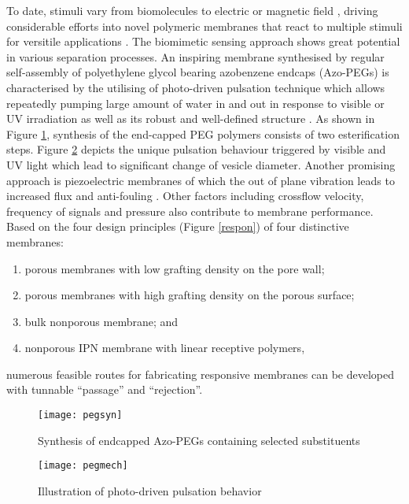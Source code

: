 \documentclass[a4paper,12pt]{report}
\begin{document}
To date, stimuli vary from biomolecules \citep{561bio} to electric \citep{562ele} or magnetic field \citep{563mag}, driving considerable efforts into novel polymeric membranes that react to multiple stimuli for versitile applications \citep{57shi}. The biomimetic sensing approach shows great potential in various separation processes. An inspiring membrane synthesised by regular self-assembly of polyethylene glycol bearing azobenzene endcaps (Azo-PEGs) is characterised by the utilising of photo-driven pulsation technique which allows repeatedly pumping large amount of water in and out in response to visible or UV irradiation as well as its robust and well-defined structure \citep{58hu}. As shown in Figure \ref{pegsyn}, synthesis of the end-capped PEG polymers consists of two esterification steps. Figure \ref{pegmech} depicts the unique pulsation behaviour triggered by visible and UV light which lead to significant change of vesicle diameter. Another promising approach is piezoelectric membranes of which the out of plane vibration leads to increased flux and anti-fouling \citep{59dare}. Other factors including crossflow velocity, frequency of signals and pressure also contribute to membrane performance. Based on the four design principles (Figure \ref{respon}) \citep{15fane} of four distinctive membranes: \begin{enumerate}
\item porous membranes with low grafting density on the pore wall; 
\item porous membranes with high grafting density on the porous surface; 
\item bulk nonporous membrane; and 
\item nonporous IPN membrane with linear receptive polymers, 
\end{enumerate}
numerous feasible routes for fabricating responsive membranes can be developed with tunnable \enquote{passage} and \enquote{rejection}.

\begin{figure}[h!]
\centering
  \texttt{[image: pegsyn]}
  \caption{Synthesis of endcapped Azo-PEGs containing selected substituents}
  \label{pegsyn}
\end{figure}

\begin{figure}[h!]
\centering
  \texttt{[image: pegmech]}
  \caption{Illustration of photo-driven pulsation behavior}
  \label{pegmech}
\end{figure}
\end{document}
